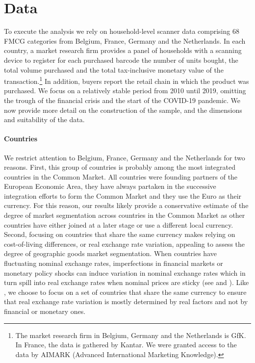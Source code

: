 \section{Data}\label{sec:data}
To execute the analysis we rely on household-level scanner data comprising 68 FMCG categories from Belgium, France, Germany and the Netherlands. In each country, a market research firm provides a panel of households with a scanning device to register for each purchased barcode the number of units bought, the total volume purchased and the total tax-inclusive monetary value of the transaction.\footnote{The market research firm in Belgium, Germany and the Netherlands is GfK. In France, the data is gathered by Kantar. We were granted access to the data by AIMARK (Advanced International Marketing Knowledge).} In addition, buyers report the retail chain in which the product was purchased. We focus on a relatively stable period from 2010 until 2019, omitting the trough of the financial crisis and the start of the COVID-19 pandemic. We now provide more detail on the construction of the sample, and the dimensions and suitability of the data.

\paragraph{Countries} We restrict attention to Belgium, France, Germany and the Netherlands for two reasons. First, this group of countries is probably among the most integrated countries in the Common Market. All countries were founding partners of the European Economic Area, they have always partaken in the successive integration efforts to form the Common Market and they use the Euro as their currency. For this reason, our results likely provide a conservative estimate of the degree of market segmentation across countries in the Common Market as other countries have either joined at a later stage or use a different local currency. Second, focusing on countries that share the same currency makes relying on cost-of-living differences, or real exchange rate variation, appealing to assess the degree of geographic goods market segmentation. When countries have fluctuating nominal exchange rates, imperfections in financial markets or monetary policy shocks can induce variation in nominal exchange rates which in turn spill into real exchange rates when nominal prices are sticky (see \citet{Heathcote2014} and \citet{Itskhoki2021}). Like \citet{Berka2018}, we choose to focus on a set of countries that share the same currency to ensure that real exchange rate variation is mostly determined by real factors and not by financial or monetary ones. 

